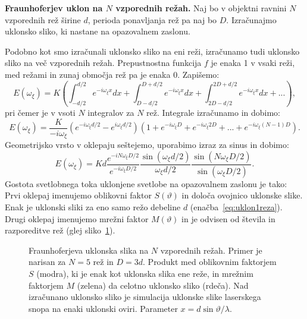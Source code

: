 \begin{example}{\bf Fraunhoferjev uklon na $N$ vzporednih režah.}
Naj bo v objektni ravnini $N$ vzporednih rež širine $d$, perioda ponavljanja
rež pa naj bo $D$. Izračunajmo uklonsko sliko, ki nastane na opazovalnem zaslonu.

Podobno kot smo izračunali uklonsko sliko na eni reži, izračunamo tudi uklonsko sliko
na več vzporednih režah. Prepustnostna funkcija $f$ je enaka 1 v vsaki reži, med
režami in zunaj območja rež pa je enaka 0. Zapišemo:
\begin{equation}
E(\omega_\xi) = K
\left( \int_{-d/2}^{d/2} e^{-i\omega_\xi x} dx + \int_{D-d/2}^{D+d/2} e^{-i\omega_\xi x} dx +
\int_{2D-d/2}^{2D+d/2} e^{-i\omega_\xi x} dx + ... \right)\!\!,
\label{eq:05_25}
\end{equation}
pri čemer je v vsoti $N$ integralov za $N$ rež. Integrale izračunamo in dobimo:
\begin{equation}
E(\omega_\xi) = \frac{K}{-i\omega_\xi}
\left(e^{-i\omega_\xi d/2}- e^{i\omega_\xi d/2} \right) \left(1 + e^{-i\omega_\xi D} + 
e^{-i\omega_\xi 2 D} + ...+ e^{-i\omega_\xi (N-1) D}\right)\!.
\label{eq:05_26}
\end{equation}
Geometrijsko vrsto v oklepaju seštejemo, uporabimo izraz za sinus in dobimo:
\begin{equation}
E(\omega_\xi) = Kd
\frac{e^{-iN\omega_\xi D/2}} {e^{-i\omega_\xi D/2}}
\frac{\sin(\omega_\xi d/2)}{\omega_\xi d/2} 
\frac{\sin(N\omega_\xi D/2)}{\sin(\omega_\xi D/2)}.
\label{eq:05_27}
\end{equation}
Gostota svetlobnega toka uklonjene svetlobe na opazovalnem zaslonu je tako:
Prvi oklepaj imenujemo oblikovni faktor $S(\vartheta)$
in določa ovojnico 
uklonske slike. Enak je uklonski sliki za eno samo režo debeline $d$ 
(enačba~\ref{eq:uklon1reza}). 
Drugi oklepaj imenujemo mrežni faktor $M(\vartheta)$
in je odvisen od števila in razporeditve rež (glej sliko~\ref{fig:05_Nrez}). 

\begin{figure}[ht]
\centering
\def\svgwidth{140truemm} 

\caption{Fraunhoferjeva uklonska slika na $N$ vzporednih režah. 
Primer je narisan za $N=5$ rež in $D=3d$. Produkt med oblikovnim faktorjem 
$S$ (modra), ki je enak kot uklonska slika ene reže, in mrežnim
faktorjem $M$ (zelena) da celotno uklonsko sliko (rdeča). Nad izračunano
uklonsko sliko je simulacija uklonske slike laserskega snopa na enaki uklonski oviri.
Parameter $x = d\sin \vartheta/\lambda$.}
\label{fig:05_Nrez}
\end{figure}


\end{example}
